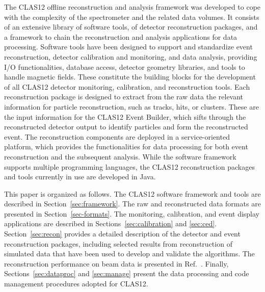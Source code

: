 The CLAS12 offline reconstruction and analysis framework was developed to cope with the complexity of the
spectrometer and the related data volumes. It consists of an extensive library of software tools, of detector
reconstruction packages, and a framework to chain the reconstruction and analysis applications for data
processing. Software tools have been designed to support and standardize event reconstruction, detector
calibration and monitoring, and data analysis, providing I/O functionalities, database access, detector geometry
libraries, and tools to handle magnetic fields. These constitute the building blocks for the development of all
CLAS12 detector monitoring, calibration, and reconstruction tools. Each reconstruction package is designed to
extract from the raw data the relevant information for particle reconstruction, such as tracks, hits, or clusters.
These are the input information for the CLAS12 Event Builder, which sifts through the reconstructed detector
output to identify particles and form the reconstructed event. The reconstruction components are deployed in a
service-oriented platform, which provides the functionalities for data processing for both event reconstruction
and the subsequent analysis. While the software framework supports multiple programming languages, the CLAS12
reconstruction packages and tools currently in use are developed in Java.

This paper is organized as follows. The CLAS12 software framework and tools are described in
Section~\ref{sec:framework}. The raw and reconstructed data formats are presented in Section~\ref{sec-formats}.
The monitoring, calibration, and event display applications are described in Sections~\ref{sec:calibration} and
\ref{sec:ced}. Section~\ref{sec:recon} provides a detailed description of the detector and event reconstruction
packages, including selected results from reconstruction of simulated data that have been used to develop and
validate the algorithms. The reconstruction performance on beam data is presented in Ref.~\cite{clas12-nim}.
Finally, Sections~\ref{sec:dataproc} and \ref{sec:manage} present the data processing and code management
procedures adopted for CLAS12.
